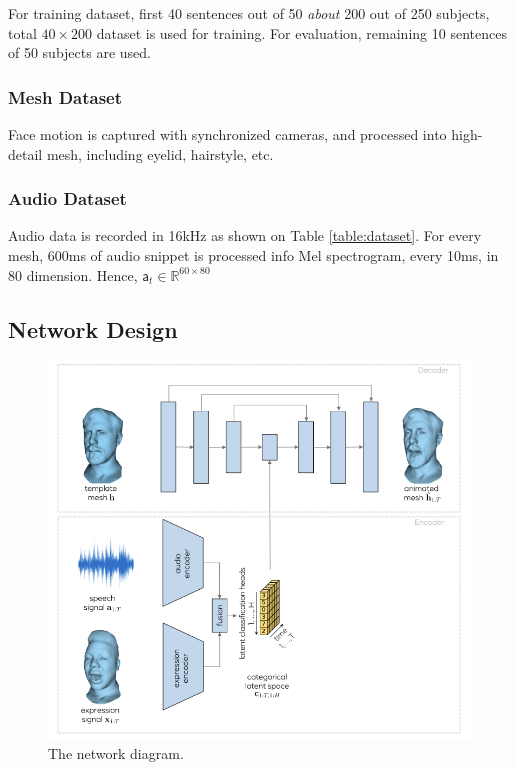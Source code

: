 \documentclass[10pt,twocolumn,letterpaper]{article}
\begin{document}
      For training dataset, first 40 sentences out of 50 \textit{about} 200 out of 250 subjects, total $40\times 200$ dataset is used for training. For evaluation, remaining 10 sentences of 50 subjects are used.
      \subsubsection*{Mesh Dataset}
      Face motion is captured with synchronized cameras, and processed into high-detail mesh, including eyelid, hairstyle, etc.
      \subsubsection*{Audio Dataset}
      Audio data is recorded in 16kHz as shown on Table \ref{table:dataset}.
      For every mesh, 600ms of audio snippet is processed info Mel spectrogram, every 10ms, in 80 dimension. Hence, \(\mathsf{a}_t \in \mathbb{R}^{60 \times 80}\)      
 
    \subsection{Network Design}


    \begin{figure}[t]
      \begin{center}
      \includegraphics[width=0.8\linewidth]{meshtalk_overview.png}
      \end{center}
      \caption{The network diagram\cite{richard2021meshtalk}.}
      \label{fig:long}
      \label{fig:networkdiag}
    \end{figure}
\end{document}
